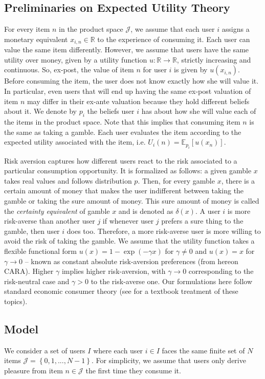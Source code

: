\documentclass[manuscript]{acmart}
\newcommand{\xhdr}[1]{\vspace{1mm} \noindent{\bf #1}}
\begin{document}
\subsection{Preliminaries on Expected Utility Theory}
\noindent For every item $n$ in the product space $\mathcal J$, we assume that each user $i$ assigns a monetary equivalent $x_{i,n} \in \mathbb R$ to the experience of consuming it. Each user can value the same item differently. However, we assume that users have the same utility over money, given by a utility function $u: \mathbb R \to \mathbb R$, strictly increasing and continuous. So, ex-post, the value of item $n$ for user $i$ is given by $u(x_{i,n})$. Before consuming the item, the user does not know exactly how she will value it. In particular, even users that will end up having the same ex-post valuation of item $n$ may differ in their ex-ante valuation because they hold different beliefs about it. We denote by $p_{i}$ the beliefs user $i$ has about how she will value each of the items in the product space. Note that this implies that consuming item $n$ is the same as taking a gamble. Each user evaluates the item according to the expected utility associated with the item, i.e. $U_i(n)=\mathbb E_{p_i}[u(x_n)]$. 
\par
Risk aversion captures how different users react to the risk associated to a particular consumption opportunity. It is formalized as follows: a given gamble $x$ takes real values and follows distribution $p$. Then, for every gamble $x$, there is a certain amount of money that makes the user indifferent between taking the gamble or taking the sure amount of money. This sure amount of money is called the \textit{certainty equivalent} of gamble $x$ and is denoted as $\delta(x)$. A user $i$ is more risk-averse than another user $j$ if whenever user $j$ prefers a sure thing to the gamble, then user $i$ does too. Therefore, a more risk-averse user is more willing to avoid the risk of taking the gamble. We assume that the utility function takes a flexible functional form $u(x)=1-\exp(-\gamma x)$ for $\gamma\ne0$ and $u(x)=x$ for $\gamma\to 0$ -- known as constant absolute risk-aversion preferences (from hereon CARA). Higher $\gamma$ implies higher risk-aversion, with $\gamma \to 0$ corresponding to the risk-neutral case and $\gamma>0$ to the risk-averse one. Our formulations here follow standard economic consumer theory (see \cite{mas1995microeconomic} for a textbook treatment of these topics).
\par

\subsection{Model}
\par
\xhdr{Users.} We consider a set of users $I$ where each user $i \in I$ faces the same finite set of $N$ items $\mathcal J = \left\{0,1,...,N-1\right\}$. For simplicity, we assume that users only derive pleasure from item $n \in \mathcal{J}$ the first time they consume it.
\par
\end{document}
